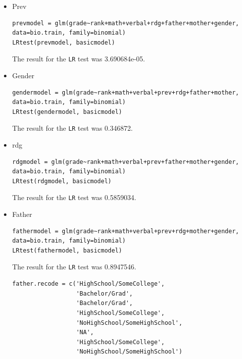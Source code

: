 \documentclass[11pt]{article}
\begin{document}
\begin{enumerate}
\begin{enumerate}
\begin{itemize}
		\item Prev
\begin{Verbatim}
prevmodel = glm(grade~rank+math+verbal+rdg+father+mother+gender, data=bio.train, family=binomial)
LRtest(prevmodel, basicmodel)
\end{Verbatim}
	The result for the \verb|LR| test was 3.690684e-05.

		\item Gender 
\begin{Verbatim}
gendermodel = glm(grade~rank+math+verbal+prev+rdg+father+mother, data=bio.train, family=binomial)
LRtest(gendermodel, basicmodel)
\end{Verbatim}
	The result for the \verb|LR| test was 0.346872.

		\item rdg
\begin{Verbatim}
rdgmodel = glm(grade~rank+math+verbal+prev+father+mother+gender, data=bio.train, family=binomial)
LRtest(rdgmodel, basicmodel)
\end{Verbatim}
	The result for the \verb|LR| test was 0.5859034.

		\item Father
\begin{Verbatim}
fathermodel = glm(grade~rank+math+verbal+prev+rdg+mother+gender, data=bio.train, family=binomial)
LRtest(fathermodel, basicmodel)
\end{Verbatim}
	The result for the \verb|LR| test was 0.8947546.

\begin{Verbatim}
father.recode = c('HighSchool/SomeCollege', 
                  'Bachelor/Grad', 
                  'Bachelor/Grad', 
                  'HighSchool/SomeCollege', 
                  'NoHighSchool/SomeHighSchool', 
                  'NA', 
                  'HighSchool/SomeCollege', 
                  'NoHighSchool/SomeHighSchool')


\end{Verbatim}
\end{itemize}
\end{enumerate}
\end{enumerate}
\end{document}
